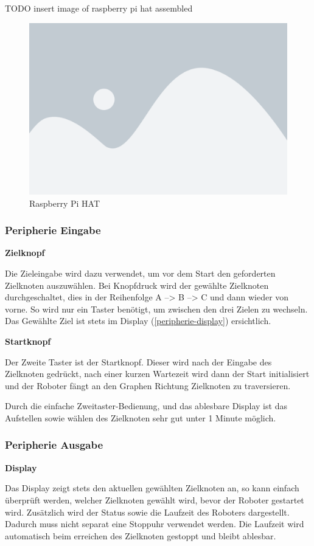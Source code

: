TODO insert image of raspberry pi hat assembled
\begin{figure}[H]
    \centering
    \includegraphics[width=0.5\linewidth]{assets/placeholder.png}
    \caption{Raspberry Pi HAT}
    \label{fig:raspiheader-assembly}
\end{figure}

\subsubsection{Peripherie Eingabe}
\label{zieleingabe}

\textbf{Zielknopf}

Die Zieleingabe wird dazu verwendet, um vor dem Start den geforderten Zielknoten auszuwählen. Bei Knopfdruck wird der gewählte Zielknoten durchgeschaltet, dies in der Reihenfolge A --> B --> C und dann wieder von vorne. So wird nur ein Taster benötigt, um zwischen den drei Zielen zu wechseln. Das Gewählte Ziel ist stets im Display (\ref{peripherie-display}) ersichtlich.

\textbf{Startknopf}

Der Zweite Taster ist der Startknopf. Dieser wird nach der Eingabe des Zielknoten gedrückt, nach einer kurzen Wartezeit wird dann der Start initialisiert und der Roboter fängt an den Graphen Richtung Zielknoten zu traversieren.

Durch die einfache Zweitaster-Bedienung, und das ablesbare Display ist das Aufstellen sowie wählen des Zielknoten sehr gut unter 1 Minute möglich. 

\subsubsection{Peripherie Ausgabe}

\textbf{Display}\label{peripherie-display}

Das Display zeigt stets den aktuellen gewählten Zielknoten an, so kann einfach überprüft werden, welcher Zielknoten gewählt wird, bevor der Roboter gestartet wird. 
Zusätzlich wird der Status sowie die Laufzeit des Roboters dargestellt. Dadurch muss nicht separat eine Stoppuhr verwendet werden. Die Laufzeit wird automatisch beim erreichen des Zielknoten gestoppt und bleibt ablesbar.

